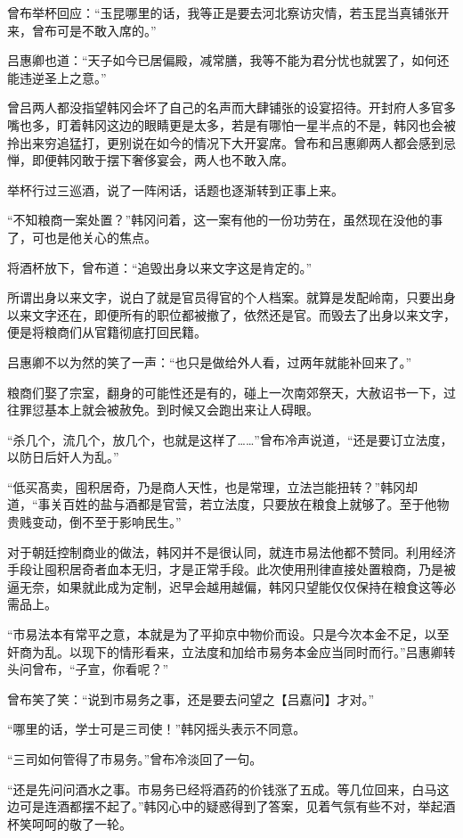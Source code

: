 曾布举杯回应：“玉昆哪里的话，我等正是要去河北察访灾情，若玉昆当真铺张开来，曾布可是不敢入席的。”

吕惠卿也道：“天子如今已居偏殿，减常膳，我等不能为君分忧也就罢了，如何还能违逆圣上之意。”

曾吕两人都没指望韩冈会坏了自己的名声而大肆铺张的设宴招待。开封府人多官多嘴也多，盯着韩冈这边的眼睛更是太多，若是有哪怕一星半点的不是，韩冈也会被拎出来穷追猛打，更别说在如今的情况下大开宴席。曾布和吕惠卿两人都会感到忌惮，即便韩冈敢于摆下奢侈宴会，两人也不敢入席。

举杯行过三巡酒，说了一阵闲话，话题也逐渐转到正事上来。

“不知粮商一案处置？”韩冈问着，这一案有他的一份功劳在，虽然现在没他的事了，可也是他关心的焦点。

将酒杯放下，曾布道：“追毁出身以来文字这是肯定的。”

所谓出身以来文字，说白了就是官员得官的个人档案。就算是发配岭南，只要出身以来文字还在，即便所有的职位都被撤了，依然还是官。而毁去了出身以来文字，便是将粮商们从官籍彻底打回民籍。

吕惠卿不以为然的笑了一声：“也只是做给外人看，过两年就能补回来了。”

粮商们娶了宗室，翻身的可能性还是有的，碰上一次南郊祭天，大赦诏书一下，过往罪愆基本上就会被赦免。到时候又会跑出来让人碍眼。

“杀几个，流几个，放几个，也就是这样了……”曾布冷声说道，“还是要订立法度，以防日后奸人为乱。”

“低买髙卖，囤积居奇，乃是商人天性，也是常理，立法岂能扭转？”韩冈却道，“事关百姓的盐与酒都是官营，若立法度，只要放在粮食上就够了。至于他物贵贱变动，倒不至于影响民生。”

对于朝廷控制商业的做法，韩冈并不是很认同，就连市易法他都不赞同。利用经济手段让囤积居奇者血本无归，才是正常手段。此次使用刑律直接处置粮商，乃是被逼无奈，如果就此成为定制，迟早会越用越偏，韩冈只望能仅仅保持在粮食这等必需品上。

“市易法本有常平之意，本就是为了平抑京中物价而设。只是今次本金不足，以至奸商为乱。以现下的情形看来，立法度和加给市易务本金应当同时而行。”吕惠卿转头问曾布，“子宣，你看呢？”

曾布笑了笑：“说到市易务之事，还是要去问望之【吕嘉问】才对。”

“哪里的话，学士可是三司使！”韩冈摇头表示不同意。

“三司如何管得了市易务。”曾布冷淡回了一句。

“还是先问问酒水之事。市易务已经将酒药的价钱涨了五成。等几位回来，白马这边可是连酒都摆不起了。”韩冈心中的疑惑得到了答案，见着气氛有些不对，举起酒杯笑呵呵的敬了一轮。


